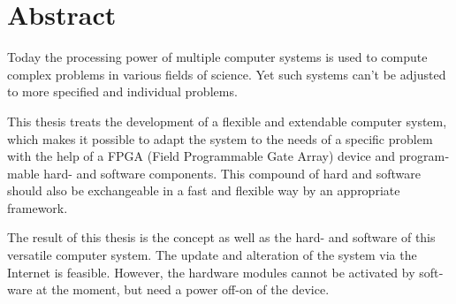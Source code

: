 \chapter{Abstract}

\begin{english} %

Today the processing power of multiple computer systems is used to compute
complex problems in various fields of science.
Yet such systems can't be adjusted to more specified and individual problems.

This thesis treats the development of a flexible and extendable computer system,
which makes it possible to adapt the system to the needs of a specific
problem with the help of a FPGA (Field Programmable Gate Array) device and
programmable hard- and software components.
This compound of hard and software should also be exchangeable in a fast and
flexible way by an appropriate framework.

The result of this thesis is the concept as well as the hard- and software of
this versatile computer system. The update and alteration of the system via the
Internet is feasible.
However, the hardware modules cannot be activated by software at the moment, but
need a power off-on of the device.

\end{english}
